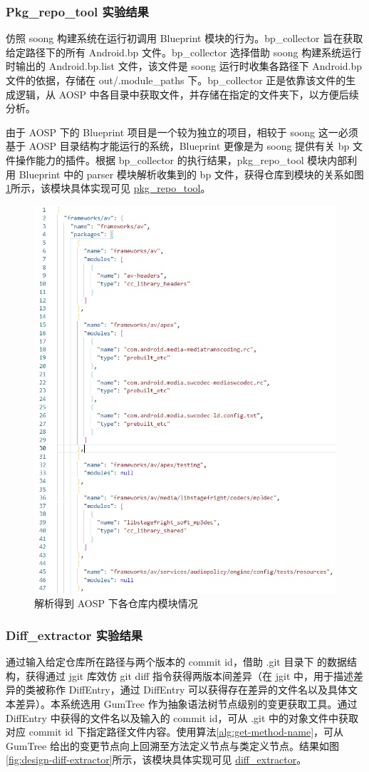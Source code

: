 \subsubsection{Pkg\_repo\_tool 实验结果}

仿照 soong 构建系统在运行初调用 Blueprint 模块的行为。bp\_collector 旨在获取给定路径下的所有 Android.bp 文件。bp\_collector 选择借助 soong 构建系统运行时输出的 Android.bp.list 文件，该文件是 soong 运行时收集各路径下 Android.bp 文件的依据，存储在 out/.module\_paths 下。bp\_collector 正是依靠该文件的生成逻辑，从 AOSP 中各目录中获取文件，并存储在指定的文件夹下，以方便后续分析。

由于 AOSP 下的 Blueprint 项目是一个较为独立的项目，相较于 soong 这一必须基于 AOSP 目录结构才能运行的系统，Blueprint 更像是为 soong 提供有关 bp 文件操作能力的插件。根据 bp\_collector 的执行结果，pkg\_repo\_tool 模块内部利用 Blueprint 中的 parser 模块解析收集到的 bp 文件，获得仓库到模块的关系如图\ref{fig:design-repo-pkg-relation}所示，该模块具体实现可见 \href{https://github.com/AOSPworking/pkg_repo_tool}{pkg\_repo\_tool}。

\begin{figure}[htb]
    \centering
    \includegraphics[width=.4\textwidth]{figures/design-repo-pkg-relation.png}
    \caption{解析得到 AOSP 下各仓库内模块情况}
    \label{fig:design-repo-pkg-relation}
\end{figure}

\subsubsection{Diff\_extractor 实验结果}

通过输入给定仓库所在路径与两个版本的 commit id，借助 .git 目录下 的数据结构，获得通过 jgit 库效仿 git diff 指令获得两版本间差异（在 jgit 中，用于描述差异的类被称作 DiffEntry，通过 DiffEntry 可以获得存在差异的文件名以及具体文本差异）。本系统选用 GumTree 作为抽象语法树节点级别的变更获取工具。通过 DiffEntry 中获得的文件名以及输入的 commit id，可从 .git 中的对象文件中获取对应 commit id 下指定路径文件内容。使用算法\ref{alg:get-method-name}，可从 GumTree 给出的变更节点向上回溯至方法定义节点与类定义节点。结果如图\ref{fig:design-diff-extractor}所示，该模块具体实现可见 \href{https://github.com/AOSPworking/diff_extractor}{diff\_extractor}。

